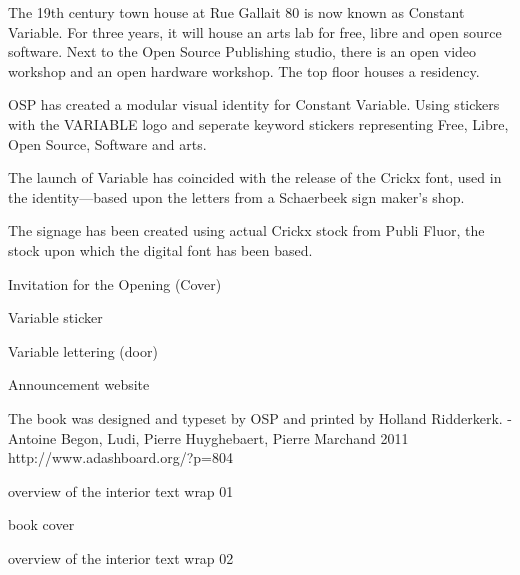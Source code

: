 
The 19th century town house at Rue Gallait 80 is now known as Constant
Variable. For three years, it will house an arts lab for free, libre and
open source software. Next to the Open Source Publishing studio, there
is an open video workshop and an open hardware workshop. The top floor
houses a residency.

OSP has created a modular visual identity for Constant Variable. Using
stickers with the VARIABLE logo and seperate keyword stickers
representing Free, Libre, Open Source, Software and arts.

The launch of Variable has coincided with the release of the Crickx
font, used in the identity---based upon the letters from a Schaerbeek
sign maker's shop.

The signage has been created using actual Crickx stock from Publi Fluor,
the stock upon which the digital font has been based.


Invitation for the Opening (Cover)


Variable sticker


Variable lettering (door)


Announcement website




\subject{Tot Later}


The book was designed and typeset by OSP and printed by Holland
Ridderkerk. - Antoine Begon, Ludi, Pierre Huyghebaert, Pierre Marchand
2011 http://www.adashboard.org/?p=804


overview of the interior text wrap 01


book cover


overview of the interior text wrap 02




